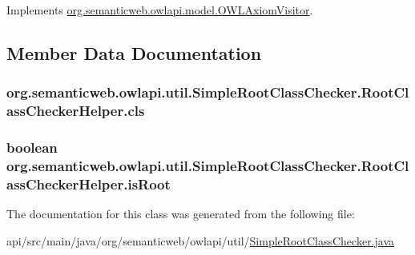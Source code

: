 Implements \hyperlink{interfaceorg_1_1semanticweb_1_1owlapi_1_1model_1_1_o_w_l_axiom_visitor_a5f2ecfc45783e6488e760ca7ff2faa13}{org.\-semanticweb.\-owlapi.\-model.\-O\-W\-L\-Axiom\-Visitor}.



\subsection{Member Data Documentation}
\hypertarget{classorg_1_1semanticweb_1_1owlapi_1_1util_1_1_simple_root_class_checker_1_1_root_class_checker_helper_ac1c8277e59cc6fad24a60930c50b8695}{
\subsubsection[{cls}]{ org.\-semanticweb.\-owlapi.\-util.\-Simple\-Root\-Class\-Checker.\-Root\-Class\-Checker\-Helper.\-cls\hspace{0.3cm}{\ttfamily [private]}}}\label{classorg_1_1semanticweb_1_1owlapi_1_1util_1_1_simple_root_class_checker_1_1_root_class_checker_helper_ac1c8277e59cc6fad24a60930c50b8695}
\hypertarget{classorg_1_1semanticweb_1_1owlapi_1_1util_1_1_simple_root_class_checker_1_1_root_class_checker_helper_aaa17285b9b99b240fea705ba12443cd0}{
\subsubsection[{is\-Root}]{\setlength{\rightskip}{0pt plus 5cm}boolean org.\-semanticweb.\-owlapi.\-util.\-Simple\-Root\-Class\-Checker.\-Root\-Class\-Checker\-Helper.\-is\-Root\hspace{0.3cm}{\ttfamily [private]}}}\label{classorg_1_1semanticweb_1_1owlapi_1_1util_1_1_simple_root_class_checker_1_1_root_class_checker_helper_aaa17285b9b99b240fea705ba12443cd0}


The documentation for this class was generated from the following file\-:\begin{DoxyCompactItemize}
\item 
api/src/main/java/org/semanticweb/owlapi/util/\hyperlink{_simple_root_class_checker_8java}{Simple\-Root\-Class\-Checker.\-java}\end{DoxyCompactItemize}
